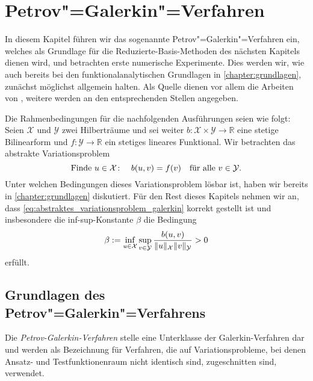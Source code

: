 \documentclass[../main.tex]{subfiles}
\begin{document}
\chapter{Petrov"=Galerkin"=Verfahren} %
\label{chapter:galerkin}

In diesem Kapitel führen wir das sogenannte Petrov"=Galerkin"=Verfahren ein, welches als Grundlage für die Reduzierte-Basis-Methoden des nächsten Kapitels dienen wird, und betrachten erste numerische Experimente.
Dies werden wir, wie auch bereits bei den funktionalanalytischen Grundlagen in \cref{chapter:grundlagen}, zunächst möglichst allgemein halten.
Als Quelle dienen vor allem die Arbeiten von \textcite{Braess:2007wm,Patera:2007un,Quarteroni:2011jm}, weitere werden an den entsprechenden Stellen angegeben.

Die Rahmenbedingungen für die nachfolgenden Ausführungen seien wie folgt:
Seien $\mathcal X$ und $\mathcal Y$ zwei Hilberträume und sei weiter $b \colon \mathcal X \times \mathcal Y \to \mathbb{R}$ eine stetige Bilinearform und $f \colon \mathcal Y \to \mathbb{R}$ ein stetiges lineares Funktional.
Wir betrachten das abstrakte Variationsproblem
\begin{equation}
    \label{eq:abstraktes_variationsproblem_galerkin}
    \text{Finde}~u \in \mathcal X \colon \quad  b(u, v) = f(v) \quad \fa v \in \mathcal Y.
\end{equation}
Unter welchen Bedingungen dieses Variationsproblem lösbar ist, haben wir bereits in \cref{chapter:grundlagen} diskutiert.
Für den Rest dieses Kapitels nehmen wir an, dass \cref{eq:abstraktes_variationsproblem_galerkin} korrekt gestellt ist und insbesondere die inf-sup-Konstante $\beta$ die Bedingung
\begin{equation}
    \label{eq:abstraktes_variationsproblem_galerkin_infsup}
    \beta := \inf_{u \in \mathcal X} \sup_{v \in \mathcal Y} \frac{b(u, v)}{\norm{u}_{\mathcal X} \norm{v}_{\mathcal Y}} > 0
\end{equation}
erfüllt.

\section{Grundlagen des Petrov"=Galerkin"=Verfahrens} %
\label{section:petrov_galerkin_grundlagen}

Die \emph{Petrov-Galerkin-Verfahren} stelle eine Unterklasse der Galerkin-Verfahren dar und werden als Bezeichnung für Verfahren, die auf Variationsprobleme, bei denen Ansatz- und Testfunktionenraum nicht identisch sind, zugeschnitten sind, verwendet.
\end{document}
